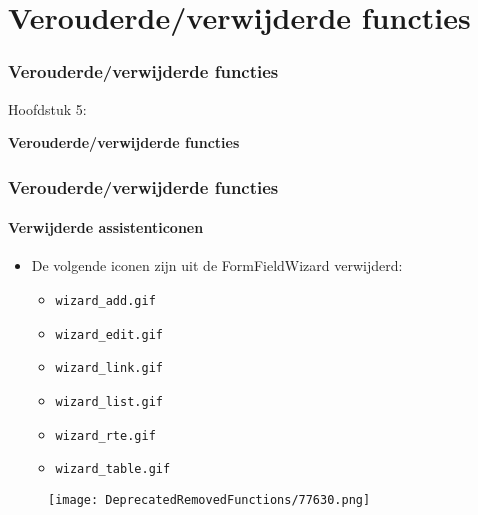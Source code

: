 %

\section{Verouderde/verwijderde functies}
\begin{frame}[fragile]
	\frametitle{Verouderde/verwijderde functies}

	\begin{center}\huge{Hoofdstuk 5:}\end{center}
	\begin{center}\huge{\color{typo3darkgrey}\textbf{Verouderde/verwijderde functies}}\end{center}

\end{frame}

\begin{frame}[fragile]
	\frametitle{Verouderde/verwijderde functies}
	\framesubtitle{Verwijderde assistenticonen}

	\begin{itemize}

		\item De volgende iconen zijn uit de FormFieldWizard verwijderd:

			\begin{itemize}
				\item \texttt{wizard\_add.gif}
				\item \texttt{wizard\_edit.gif}
				\item \texttt{wizard\_link.gif}
				\item \texttt{wizard\_list.gif}
				\item \texttt{wizard\_rte.gif}
				\item \texttt{wizard\_table.gif}
			\end{itemize}

	\end{itemize}

	\begin{figure}
		\texttt{[image: DeprecatedRemovedFunctions/77630.png]}
	\end{figure}

\end{frame}

